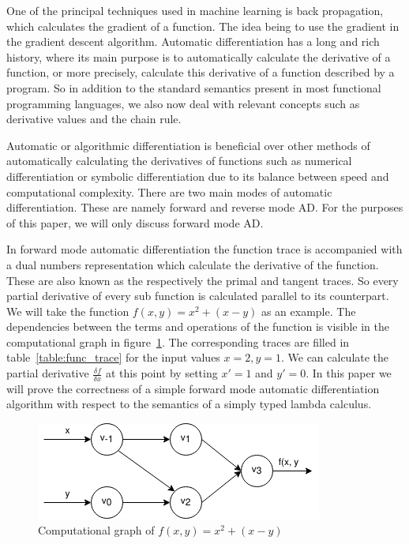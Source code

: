 \documentclass[12pt, final]{article}
\begin{document}

One of the principal techniques used in machine learning is back propagation, which calculates the gradient of a function.
The idea being to use the gradient in the gradient descent algorithm\cite{Baydin2015AutomaticDI}.
Automatic differentiation has a long and rich history, where its main purpose is to automatically calculate the derivative of a function, or more precisely, calculate this derivative of a function described by a program.
So in addition to the standard semantics present in most functional programming languages, we also now deal with relevant concepts such as derivative values and the chain rule.

Automatic or algorithmic differentiation is beneficial over other methods of automatically calculating the derivatives of functions such as numerical differentiation or symbolic differentiation due to its balance between speed and computational complexity.
There are two main modes of automatic differentiation.
These are namely forward and reverse mode AD. For the purposes of this paper, we will only discuss forward mode AD.

In forward mode automatic differentiation the function trace is accompanied with a dual numbers representation which calculate the derivative of the function. These are also known as the respectively the primal and tangent traces. So every partial derivative of every sub function is calculated parallel to its counterpart. We will take the function $f(x, y) = x^2 + (x - y)$ as an example. The dependencies between the terms and operations of the function is visible in the computational graph in figure~\ref{fig:func_trace}. The corresponding traces are filled in table~\ref{table:func_trace} for the input values $x = 2, y = 1$. We can calculate the partial derivative $\frac{\delta f}{\delta x}$ at this point by setting $x' = 1$ and $y' = 0$. In this paper we will prove the correctness of a simple forward mode automatic differentiation algorithm with respect to the semantics of a simply typed lambda calculus.

\begin{figure}[h]
  \centering
  \includegraphics[scale=0.6]{assets/function_trace.png}
  \caption{Computational graph of $f(x, y) = x^2 + (x - y)$}
  \label{fig:func_trace}
\end{figure}
\end{document}
